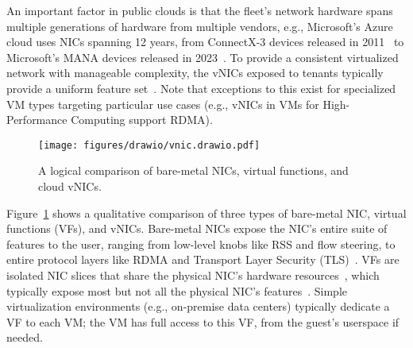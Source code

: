 An important factor in public clouds is that the fleet's network hardware spans multiple generations of hardware from multiple vendors, e.g., Microsoft's Azure cloud uses NICs spanning 12 years, from ConnectX-3 devices released in 2011~\cite{connectx3} to Microsoft's MANA devices released in 2023~\cite{mana, mana-kernel}.
To provide a consistent virtualized network with manageable complexity, the vNICs exposed to tenants typically provide a uniform feature set~\cite{gpoll, ec2poll, netvsc}.
Note that exceptions to this exist for specialized VM types targeting particular use cases (e.g., vNICs in VMs for High-Performance Computing support RDMA).

\begin{figure}[t!]
\centering
\texttt{[image: figures/drawio/vnic.drawio.pdf]}
\caption{A logical comparison of bare-metal NICs, virtual functions, and cloud vNICs.}
\label{fig:diff-nic}
\end{figure}


Figure~\ref{fig:diff-nic} shows a qualitative comparison of three types of bare-metal NIC, virtual functions (VFs), and vNICs.
Bare-metal NICs expose the NIC's entire suite of features to the user, ranging from low-level knobs like RSS and flow steering, to entire protocol layers like RDMA and Transport Layer Security (TLS)~\cite{Pismenny:asplos21}.
VFs are isolated NIC slices that share the physical NIC's hardware resources~\cite{vf}, which typically expose most but not all the physical NIC's features~\cite{gpoll, ec2poll, netvsc}.
Simple virtualization environments (e.g., on-premise data centers) typically dedicate a VF to each VM; the VM has full access to this VF, from the guest's userspace if needed.


